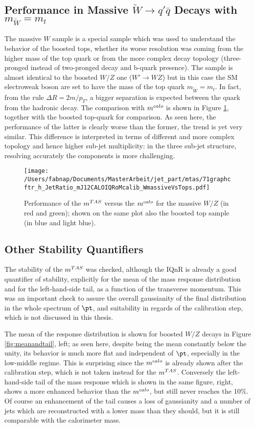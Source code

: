 \subsection{Performance in Massive $\tilde{W}\to q'\bar{q}$ Decays with $m_{\tilde{W}}=m_t$}
The massive $W$ sample is a special sample which was used to understand the behavior of the boosted tops, whether its worse resolution was coming from the higher mass of the top quark or from the more complex decay topology (three-pronged instead of two-pronged decay and b-quark presence). 
The sample is almost identical to the boosted $W/Z$ one ($W'\to WZ$) but in this case the SM electroweak boson are set to have the mass of the top quark $m_{\tilde{W}}=m_t$.
In fact, from the rule $\Delta R=2m/p_T$, a bigger separation is expected between the quark from the hadronic decay.
The comparison with $m^{calo}$ is shown in Figure \ref{fig:mtas6}, together with the boosted top-quark for comparison. As seen here, the performance of the latter is clearly worse than the former, the trend is yet very similar. This difference is interpreted in terms of different and more complex topology and hence higher sub-jet multiplicity: in the three sub-jet structure, resolving accurately the components is more challenging.

\begin{figure}[!ht]
  \centering
     \texttt{[image: /Users/fabnap/Documents/MasterArbeit/jet\_part/mtas/71graphcftr\_h\_JetRatio\_mJ12CALOIQRoMcalib\_WmassiveVsTops.pdf]}
   \caption[$\mtas$ for boosted massive $W/Z$]{Performance of the $\mtas$ versus the $m^{calo}$ for the massive $W/Z$ (in red and green); shown on the same plot also the boosted top sample (in blue and light blue).}
  \label{fig:mtas6}
\end{figure}

\subsection{Other Stability Quantifiers}
The stability of the $\mtas$ was checked, although the IQnR is already a good quantifier of stability, explicitly for the mean of the mass response distribution and for the left-hand-side tail, as a function of the transverse momentum. This was an important check to assure the overall gaussianity of the final distribution in the whole spectrum of $\pt$, and suitability in regards of the calibration step, which is not discussed in this thesis.

The mean of the response distribution is shown for boosted $W/Z$ decays in Figure \ref{fig:meanandtail}, left; as seen here, despite being the mean constantly below the unity, its behavior is much more flat and independent of $\pt$, especially in the low-middle regime. This is surprising since the $m^{calo}$ is already shown after the calibration step, which is not taken instead for the $\mtas$. Conversely the left-hand-side tail of the mass response which is shown in the same figure, right, shows a more enhanced behavior than the $m^{calo}$, but still never reaches the 10\%. Of course an enhancement of the tail causes a loss of gaussianity and a number of jets which are reconstructed with a lower mass than they should, but it is still comparable with the calorimeter mass.

